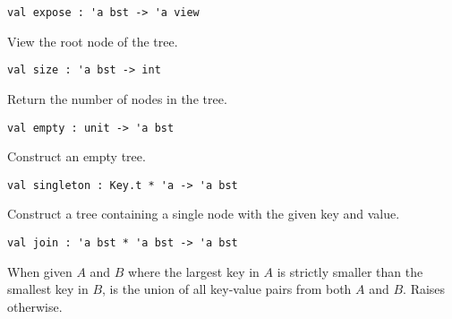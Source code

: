 \begin{cluster}
\label{grp:grm:bst-interface::expose}

\begin{gram}[expose]
\label{grm:bst-interface::expose}
\begin{verbatim}
val expose : 'a bst -> 'a view
\end{verbatim}
View the root node of the tree.

\end{gram}
\end{cluster}

\begin{cluster}
\label{grp:grm:bst-interface::size}

\begin{gram}[size]
\label{grm:bst-interface::size}
\begin{verbatim}
val size : 'a bst -> int
\end{verbatim}
Return the number of nodes in the tree.

\end{gram}
\end{cluster}

\begin{cluster}
\label{grp:grm:bst-interface::empty}

\begin{gram}[empty]
\label{grm:bst-interface::empty}
\begin{verbatim}
val empty : unit -> 'a bst
\end{verbatim}
Construct an empty tree.

\end{gram}
\end{cluster}

\begin{cluster}
\label{grp:grm:bst-interface::singleton}

\begin{gram}[singleton]
\label{grm:bst-interface::singleton}
\begin{verbatim}
val singleton : Key.t * 'a -> 'a bst
\end{verbatim}
Construct a tree containing a single node with the given key and value.

\end{gram}
\end{cluster}

\begin{cluster}
\label{grp:grm:bst-interface::join}

\begin{gram}[join]
\label{grm:bst-interface::join}
\begin{verbatim}
val join : 'a bst * 'a bst -> 'a bst
\end{verbatim}
When given $A$ and $B$ where the largest key in $A$ is strictly smaller than
the smallest key in $B$,  is the union of all key-value pairs
from both $A$ and $B$. Raises  otherwise.

\end{gram}
\end{cluster}

